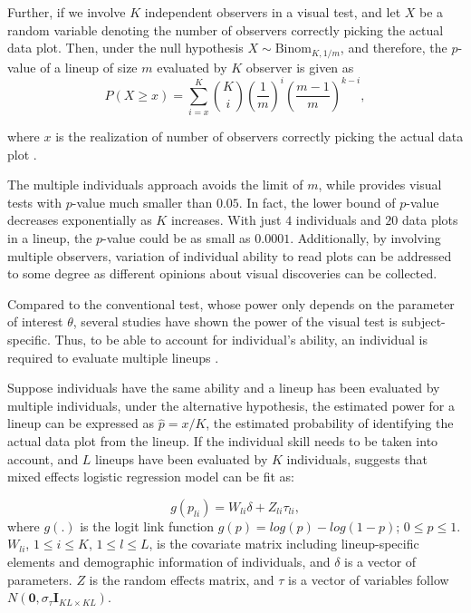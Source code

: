 \documentclass{monashthesis}
\theoremstyle{definition}
\theoremstyle{definition}
\theoremstyle{definition}
\theoremstyle{definition}
\theoremstyle{remark}
\begin{document}
Further, if we involve \(K\) independent observers in a visual test, and let \(X\) be a random variable denoting the number of observers correctly picking the actual data plot. Then, under the null hypothesis \(X \sim \mathrm{Binom}_{K,1/m}\), and therefore, the \(p\)-value of a lineup of size \(m\) evaluated by \(K\) observer is given as
\begin{equation} \label{eq:pvaluesingle}
P(X \geq x) = \sum_{i=x}^{K}{{K}\choose{i}}\left(\frac{1}{m}\right)^i\left(\frac{m-1}{m}\right)^{k-i},
\end{equation}

where \(x\) is the realization of number of observers correctly picking the actual data plot \autocite{majumder_validation_2013}.

The multiple individuals approach avoids the limit of \(m\), while provides visual tests with \(p\)-value much smaller than \(0.05\). In fact, the lower bound of \(p\)-value decreases exponentially as \(K\) increases. With just \(4\) individuals and \(20\) data plots in a lineup, the \(p\)-value could be as small as \(0.0001\). Additionally, by involving multiple observers, variation of individual ability to read plots can be addressed to some degree as different opinions about visual discoveries can be collected.

Compared to the conventional test, whose power only depends on the parameter of interest \(\theta\), several studies \autocites[see][]{hofmann_graphical_2012,majumder_validation_2013,majumder_human_2014,roy_chowdhury_using_2015,loy_variations_2016} have shown the power of the visual test is subject-specific. Thus, to be able to account for individual's ability, an individual is required to evaluate multiple lineups \autocite{majumder_validation_2013}.

Suppose individuals have the same ability and a lineup has been evaluated by multiple individuals, under the alternative hypothesis, the estimated power for a lineup can be expressed as \(\hat{p} = x/K\), the estimated probability of identifying the actual data plot from the lineup. If the individual skill needs to be taken into account, and \(L\) lineups have been evaluated by \(K\) individuals, \textcite{majumder_validation_2013} suggests that mixed effects logistic regression model can be fit as:

\[g(p_{li}) = W_{li}\delta + Z_{li}\tau_{li},\]
where \(g(.)\) is the logit link function \(g(p) = log(p) - log(1-p)\); \(0 \leq p \leq 1\). \(W_{li}\), \(1 \leq i \leq K\), \(1 \leq l \leq L\), is the covariate matrix including lineup-specific elements and demographic information of individuals, and \(\delta\) is a vector of parameters. \(Z\) is the random effects matrix, and \(\tau\) is a vector of variables follow \(N(\boldsymbol{0},\sigma_{\tau}\boldsymbol{I}_{KL\times KL})\).
\end{document}
